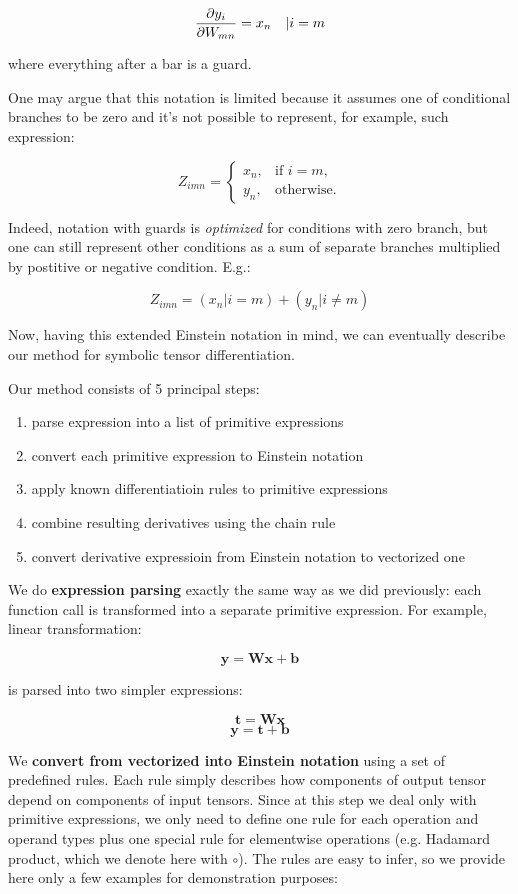 \documentclass[conference]{IEEEtran}
\begin{document}
$$\pdv{y_i}{W_{mn}} = x_n \quad | i = m$$

where everything after a bar is a guard.

One may argue that this notation is limited because it assumes one of
conditional branches to be zero and it's not possible to represent, for
example, such expression:

$$Z_{imn} = \begin{cases}
  x_n, & \text{if } i = m, \\
  y_n, & \text{otherwise}.
\end{cases}$$

Indeed, notation with guards is \textit{optimized} for conditions with
zero branch, but one can still represent other conditions as a sum of
separate branches multiplied by postitive or negative condition. E.g.:

$$Z_{imn} = (x_n | i = m) + (y_n | i \neq m)$$

Now, having this extended Einstein notation in mind, we can eventually
describe our method for symbolic tensor differentiation.

Our method consists of 5 principal steps:

\begin{enumerate}
\item parse expression into a list of primitive expressions
\item convert each primitive expression to Einstein notation
\item apply known differentiatioin rules to primitive expressions
\item combine resulting derivatives using the chain rule
\item convert derivative expressioin from Einstein notation to
  vectorized one
\end{enumerate}

We do \textbf{expression parsing} exactly the same way as we did
previously: each function call is transformed into a separate
primitive expression. For example, linear transformation:

$$\pmb{y} = \pmb{Wx} + \pmb{b}$$ 

is parsed into two simpler expressions:

$$\pmb{t} = \pmb{Wx}$$
$$\pmb{y} = \pmb{t} + \pmb{b}$$

We \textbf{convert from vectorized into Einstein notation} using a set
of predefined rules. Each rule simply describes how components of
output tensor depend on components of input tensors. Since at this
step we deal only with primitive expressions, we only need to define
one rule for each operation and operand types plus one special rule
for elementwise operations (e.g. Hadamard product, which we denote
here with $\circ$). The rules are easy to infer, so we provide here
only a few examples for demonstration purposes:
\end{document}

